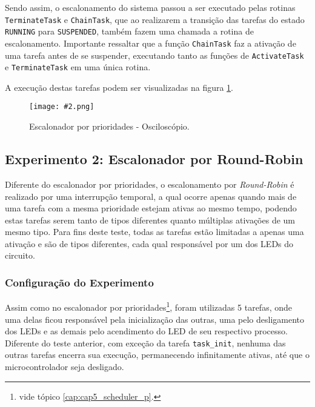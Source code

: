 \documentclass[conference,compsoc]{IEEEtran}
\newcommand{\reffig}[1]{Figura \ref{fig:#1}}
\newcommand{\refalg}[1]{Algoritmo \ref{alg:#1}}
\newcommand{\refape}[1]{Apêndice \ref{ape:#1}}
\newcommand{\refcap}[1]{\footnote{vide tópico \ref{cap:#1}.}}
\newcommand{\figura}[5][Extraido de:]{
	\begin{figure}[h!tb]
		\centering
		\caption{#3.}
		\texttt{[image: \#2.png]}
		\ifthenelse{\isempty{#5}}{}{%
			\\ #1 \cite{#5}.
		}	
		\label{fig:#2}
	\end{figure}
}
\begin{document}
Sendo assim, o escalonamento do sistema passou a ser executado pelas rotinas \texttt{TerminateTask} e \texttt{ChainTask}, que ao realizarem a transição das tarefas do estado \texttt{RUNNING} para \texttt{SUSPENDED}, também fazem uma chamada a rotina de escalonamento. Importante ressaltar que a função \texttt{ChainTask} faz a ativação de uma tarefa antes de se suspender, executando tanto as funções de \texttt{ActivateTask} e \texttt{TerminateTask} em uma única rotina.

A execução destas tarefas podem ser visualizadas na figura \ref{fig:cap5_scheduler_p_osc1a}.

\figura{cap5_scheduler_p_osc1a}{Escalonador por prioridades - Osciloscópio}{6cm}{}

\subsection{Experimento 2: Escalonador por Round-Robin}

Diferente do escalonador por prioridades, o escalonamento por \emph{Round-Robin} é realizado por uma interrupção temporal, a qual ocorre apenas quando mais de uma tarefa com a mesma prioridade estejam ativas ao mesmo tempo, podendo estas tarefas serem tanto de tipos diferentes quanto múltiplas ativações de um mesmo tipo. Para fins deste teste, todas as tarefas estão limitadas a apenas uma ativação e são de tipos diferentes, cada qual responsável por um dos LEDs do circuito.

\subsubsection{Configuração do Experimento}

Assim como no escalonador por prioridades\refcap{cap5_scheduler_p}, foram utilizadas 5 tarefas, onde uma delas ficou responsável pela inicialização das outras, uma pelo desligamento dos LEDs e as demais pelo acendimento do LED de seu respectivo processo. Diferente do teste anterior, com exceção da tarefa \texttt{task\_init}, nenhuma das outras tarefas encerra sua execução, permanecendo infinitamente ativas, até que o microcontrolador seja desligado.

\end{document}
